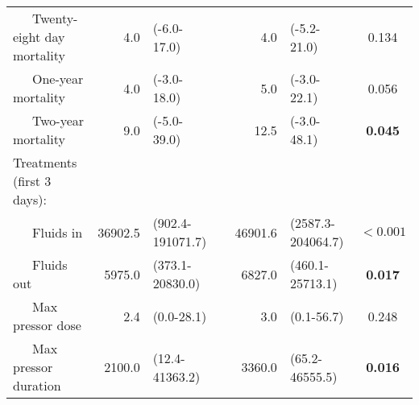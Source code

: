 {\begin{tabular}{l r l c r l c}
~~~Twenty-eight day mortality & 4.0 & (-6.0-17.0) & & 4.0 & (-5.2-21.0) & 0.134 \\ 
~~~One-year mortality & 4.0 & (-3.0-18.0) & & 5.0 & (-3.0-22.1) & 0.056 \\ 
~~~Two-year mortality & 9.0 & (-5.0-39.0) & & 12.5 & (-3.0-48.1) & \textbf{0.045} \\ 
Treatments (first 3 days): & & & & & & \\ 
~~~Fluids in & 36902.5 & (902.4-191071.7) & & 46901.6 & (2587.3-204064.7) & $\mathbf{<0.001}$ \\ 
~~~Fluids out & 5975.0 & (373.1-20830.0) & & 6827.0 & (460.1-25713.1) & \textbf{0.017} \\ 
~~~Max pressor dose & 2.4 & (0.0-28.1) & & 3.0 & (0.1-56.7) & 0.248 \\ 
~~~Max pressor duration & 2100.0 & (12.4-41363.2) & & 3360.0 & (65.2-46555.5) & \textbf{0.016} \\ 
\bottomrule
\end{tabular}
}
